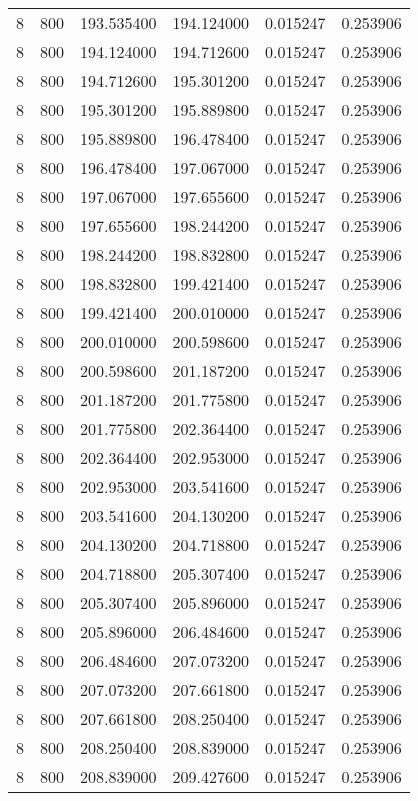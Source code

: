 \begin{longtable}{rrrrrr}
8 & 800 & 193.535400 & 194.124000 & 0.015247 & 0.253906 \\
8 & 800 & 194.124000 & 194.712600 & 0.015247 & 0.253906 \\
8 & 800 & 194.712600 & 195.301200 & 0.015247 & 0.253906 \\
8 & 800 & 195.301200 & 195.889800 & 0.015247 & 0.253906 \\
8 & 800 & 195.889800 & 196.478400 & 0.015247 & 0.253906 \\
8 & 800 & 196.478400 & 197.067000 & 0.015247 & 0.253906 \\
8 & 800 & 197.067000 & 197.655600 & 0.015247 & 0.253906 \\
8 & 800 & 197.655600 & 198.244200 & 0.015247 & 0.253906 \\
8 & 800 & 198.244200 & 198.832800 & 0.015247 & 0.253906 \\
8 & 800 & 198.832800 & 199.421400 & 0.015247 & 0.253906 \\
8 & 800 & 199.421400 & 200.010000 & 0.015247 & 0.253906 \\
8 & 800 & 200.010000 & 200.598600 & 0.015247 & 0.253906 \\
8 & 800 & 200.598600 & 201.187200 & 0.015247 & 0.253906 \\
8 & 800 & 201.187200 & 201.775800 & 0.015247 & 0.253906 \\
8 & 800 & 201.775800 & 202.364400 & 0.015247 & 0.253906 \\
8 & 800 & 202.364400 & 202.953000 & 0.015247 & 0.253906 \\
8 & 800 & 202.953000 & 203.541600 & 0.015247 & 0.253906 \\
8 & 800 & 203.541600 & 204.130200 & 0.015247 & 0.253906 \\
8 & 800 & 204.130200 & 204.718800 & 0.015247 & 0.253906 \\
8 & 800 & 204.718800 & 205.307400 & 0.015247 & 0.253906 \\
8 & 800 & 205.307400 & 205.896000 & 0.015247 & 0.253906 \\
8 & 800 & 205.896000 & 206.484600 & 0.015247 & 0.253906 \\
8 & 800 & 206.484600 & 207.073200 & 0.015247 & 0.253906 \\
8 & 800 & 207.073200 & 207.661800 & 0.015247 & 0.253906 \\
8 & 800 & 207.661800 & 208.250400 & 0.015247 & 0.253906 \\
8 & 800 & 208.250400 & 208.839000 & 0.015247 & 0.253906 \\
8 & 800 & 208.839000 & 209.427600 & 0.015247 & 0.253906 \\

\end{longtable}
